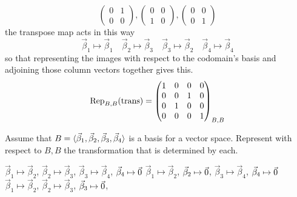 \begin{exercises}
\begin{answer}
\begin{equation*}
{\begin{pmatrix}
              0  &1  \\
              0  &0
            \end{pmatrix},
            \begin{pmatrix}
              0  &0  \\
              1  &0
            \end{pmatrix},
            \begin{pmatrix}
              0  &0  \\
              0  &1
            \end{pmatrix}   }
      \end{equation*}
      the transpose map acts in this way
      \begin{equation*}
        \vec{\beta}_1\mapsto\vec{\beta}_1 
        \quad \vec{\beta}_2\mapsto\vec{\beta}_3 
        \quad \vec{\beta}_3\mapsto\vec{\beta}_2 
        \quad \vec{\beta}_4\mapsto\vec{\beta}_4  
      \end{equation*}
      so that representing the images with respect to the codomain's
      basis and adjoining those column vectors together gives this.
      \begin{equation*}
        \rep{\text{trans}}{B,B}=
        \begin{pmatrix}
          1  &0  &0  &0  \\
          0  &0  &1  &0  \\
          0  &1  &0  &0  \\
          0  &0  &0  &1
        \end{pmatrix}_{B,B}
      \end{equation*}   
     \end{answer}
  \item 
     Assume that 
     \( B=\sequence{\vec{\beta}_1,\vec{\beta}_2,\vec{\beta}_3,\vec{\beta}_4} \)
     is a basis for a vector space.
     Represent with respect to \( B,B \) the transformation that is determined
     by each.
     \begin{exparts}
       \partsitem \( \vec{\beta}_1\mapsto\vec{\beta}_2 \),
         \( \vec{\beta}_2\mapsto\vec{\beta}_3 \),
         \( \vec{\beta}_3\mapsto\vec{\beta}_4 \),
         \( \vec{\beta}_4\mapsto\zero \)
       \partsitem \( \vec{\beta}_1\mapsto\vec{\beta}_2 \),
         \( \vec{\beta}_2\mapsto\zero \),
         \( \vec{\beta}_3\mapsto\vec{\beta}_4 \),
         \( \vec{\beta}_4\mapsto\zero \)
       \partsitem \( \vec{\beta}_1\mapsto\vec{\beta}_2 \),
         \( \vec{\beta}_2\mapsto\vec{\beta}_3 \),
         \( \vec{\beta}_3\mapsto\zero \),

\end{exparts}
\end{exercises}
